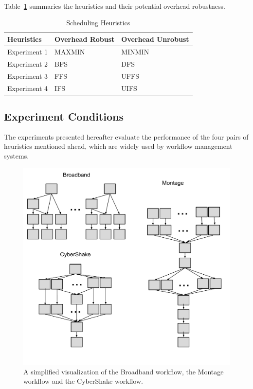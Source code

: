 Table~\ref{tab:sensitivity_heuristics} summaries the heuristics and their potential overhead robustness. 
\begin{table}[H]
\caption{Scheduling Heuristics}
\begin{center}
  \begin{tabular}{ l|l|l}
    \hline
Heuristics & Overhead Robust & Overhead Unrobust \\ \hline
    Experiment 1 & MAXMIN & MINMIN \\ \hline
   Experiment 2 & BFS & DFS \\ \hline
 Experiment 3 & FFS & UFFS \\ \hline
Experiment 4 & IFS & UIFS\\
    \hline
  \end{tabular}
\label{tab:sensitivity_heuristics}
\end{center}
\end{table}

\subsection{Experiment Conditions}


The experiments presented hereafter evaluate the performance of the four pairs of heuristics mentioned ahead, which are widely used by workflow management systems. 

\begin{figure}[htb]
	\centering
	\includegraphics[width=1.0\linewidth]{figure/shape.pdf} 
	\caption{A simplified visualization of the Broadband workflow, the Montage workflow and the CyberShake workflow.}
	\label{fig:shape}
\end{figure}

